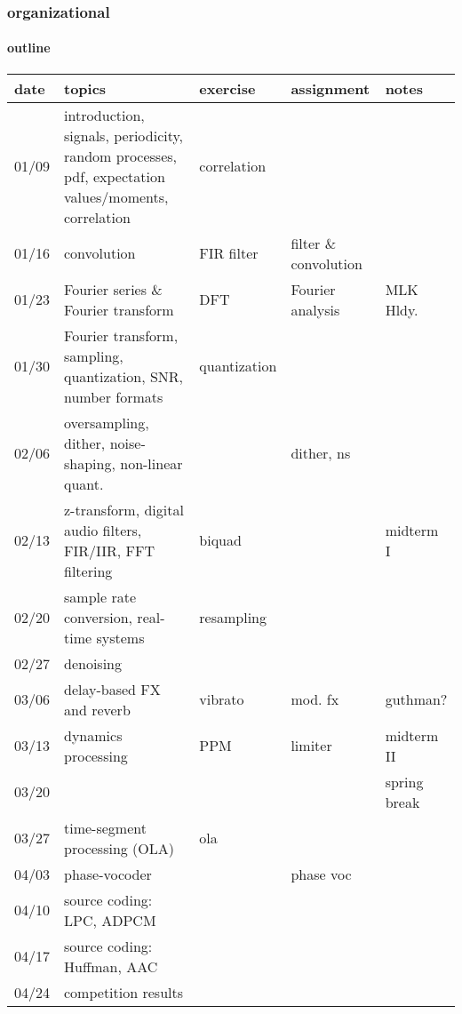        \begin{frame}\frametitle{organizational}\framesubtitle{outline}
            \vspace{-3mm}
            \begin{scriptsize}
                \begin{tabular}{l|p{.4\linewidth}|p{.1\linewidth}|p{.2\linewidth}||p{.1\linewidth}}
            \textbf{date} & \textbf{topics} & \textbf{exercise} & \textbf{assignment} & \textbf{notes}\\
            \hline\hline
            01/09 & introduction, signals, periodicity, random processes, pdf, expectation values/moments, correlation & correlation &  &  \\
            01/16 & convolution & FIR filter& filter \& convolution & \\
            01/23 & Fourier series \& Fourier transform& DFT & Fourier analysis & MLK Hldy.\\
            01/30 &Fourier transform, sampling, quantization, SNR, number formats& quantization&& \\
            02/06 &oversampling, dither, noise-shaping, non-linear quant.&&dither, ns  & \\
            02/13 &z-transform, digital audio filters, FIR/IIR, FFT filtering& biquad& & midterm I\\
            02/20 &sample rate conversion, real-time systems &resampling&& \\
            02/27 &denoising&&& \\
            03/06 &delay-based FX and reverb&vibrato& mod. fx&guthman?\\
            03/13 &dynamics processing& PPM & limiter & midterm II \\
            03/20 &&&&spring break \\
            03/27 &time-segment processing (OLA)&ola&& \\
            04/03 &phase-vocoder&& phase voc&\\
            04/10 &source coding: LPC, ADPCM&&& \\
            04/17 &source coding: Huffman, AAC&&& \\
            04/24 &competition results&&& \\
                \end{tabular}
            \end{scriptsize}
        \end{frame}

